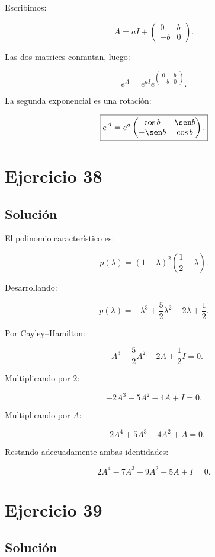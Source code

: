 \documentclass[11pt,a4paper]{article}
\begin{document}
Escribimos:

\[
A=
aI+
\begin{pmatrix}
0&b\\
-b&0
\end{pmatrix}.
\]

Las dos matrices conmutan, luego:

\[
e^A
=
e^{aI}
e^{
\left(
\begin{smallmatrix}
0&b\\
-b&0
\end{smallmatrix}
\right)
}.
\]

La segunda exponencial es una rotación:

\[
\boxed{
e^A
=
e^a
\begin{pmatrix}
\cos b&\sen b\\
-\sen b&\cos b
\end{pmatrix}.
}
\]

\section{Ejercicio 38}
\subsection{Solución}

El polinomio característico es:

\[
p(\lambda)
=
(1-\lambda)^2
\left(
\frac12-\lambda
\right).
\]

Desarrollando:

\[
p(\lambda)
=
-\lambda^3
+
\frac52\lambda^2
-
2\lambda
+
\frac12.
\]

Por Cayley--Hamilton:

\[
-A^3
+
\frac52A^2
-
2A
+
\frac12I
=
0.
\]

Multiplicando por $2$:

\[
-2A^3+5A^2-4A+I=0.
\]

Multiplicando por $A$:

\[
-2A^4+5A^3-4A^2+A=0.
\]

Restando adecuadamente ambas identidades:

\[
\boxed{
2A^4-7A^3+9A^2-5A+I=0.
}
\]

\section{Ejercicio 39}
\subsection{Solución}
\end{document}
